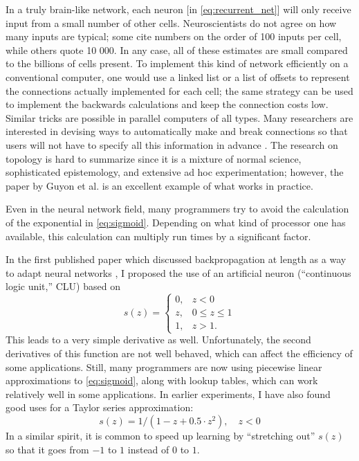 \documentclass[journal]{IEEEtran} %
\begin{document}
In a truly brain-like network, each neuron [in \eqref{eq:recurrent_net}] will only receive input from a small number of other cells. Neuroscientists do not agree on how many inputs are typical; some cite numbers on the order of 100 inputs per cell, while others quote 10 000. In any case, all of these estimates are small compared to the billions of cells present. To implement this kind of network efficiently on a conventional computer, one would use a linked list or a list of offsets to represent the connections actually implemented for each cell; the same strategy can be used to implement the backwards calculations and keep the connection costs low. Similar tricks are possible in parallel computers of all types. Many researchers are interested in devising ways to automatically make and break connections so that users will not have to specify all this information in advance \cite{Werbos:1987c}. The research on topology is hard to summarize since it is a mixture of normal science, sophisticated epistemology, and extensive ad hoc experimentation; however, the paper by Guyon et al. \cite{Guyon:1989} is an excellent example of what works in practice.

Even in the neural network field, many programmers try to avoid the calculation of the exponential in \eqref{eq:sigmoid}. Depending on what kind of processor one has available, this calculation can multiply run times by a significant factor.

In the first published paper which discussed backpropagation at length as a way to adapt neural networks \cite{Werbos:1982}, I proposed the use of an artificial neuron (``continuous logic unit,'' CLU) based on
\[ s(z) = \begin{cases}
    0, & z < 0 \\
    z, & 0 \le z \le 1 \\
    1, & z > 1.
\end{cases} \]
This leads to a very simple derivative as well. Unfortunately, the second derivatives of this function are not well behaved, which can affect the efficiency of some applications. Still, many programmers are now using piecewise linear approximations to \eqref{eq:sigmoid}, along with lookup tables, which can work relatively well in some applications. In earlier experiments, I have also found good uses for a Taylor series approximation:
\[ s(z) = 1/(1 - z + 0.5 \cdot z^2), \quad z < 0 \]
In a similar spirit, it is common to speed up learning by ``stretching out'' $s(z)$ so that it goes from $-1$ to $1$ instead of $0$ to $1$.
\end{document}
